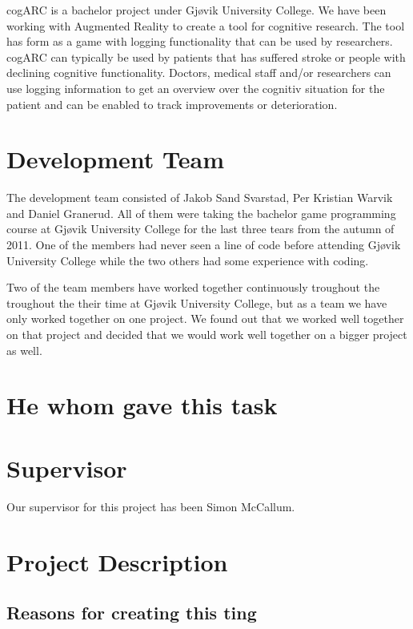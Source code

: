cogARC is a bachelor project under Gj\o vik University College. We have been
working with \gls{Augmented Reality} to create a tool for cognitive research.
The tool has form as a game with logging functionality that can be used by
researchers. cogARC can typically be used by patients that has suffered stroke
or people with declining cognitive functionality. Doctors, medical staff and/or
researchers can use logging information to get an overview over the cognitiv
situation for the patient and can be enabled to track improvements or
deterioration.

\cite{GenVirtual}

\section{Development Team}
The development team consisted of Jakob Sand Svarstad, Per Kristian Warvik and Daniel Granerud.
All of them were taking the bachelor game programming course at Gj\o vik University College for the last three tears from the autumn of 2011. One of the members had never seen a line of code before attending Gj\o vik University College while the two others had some experience with coding.

Two of the team members have worked together continuously troughout the  troughout the their time at Gj\o vik University College, but as a team we have only worked together on one project. We found out that we worked well together on that project and decided that we would work well together on a bigger project as well.

\section{He whom gave this task}

\section{Supervisor}
Our supervisor for this project has been Simon McCallum.

\section{Project Description}

\subsection{Reasons for creating this ting}

